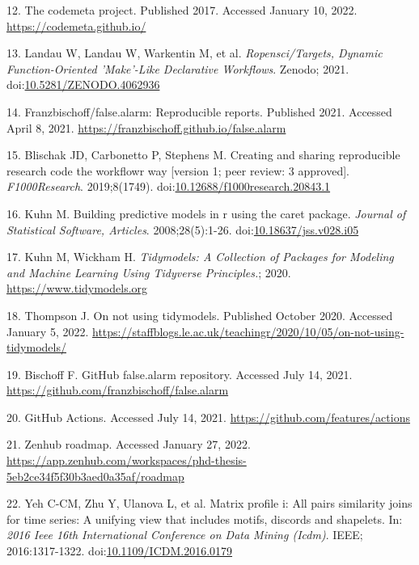 \documentclass[12pt,twoside]{fmupthesis}
\begin{document}
\leavevmode\hypertarget{ref-CodeMeta2017}{}%
12. The codemeta project. Published 2017. Accessed January 10, 2022. \url{https://codemeta.github.io/}

\leavevmode\hypertarget{ref-landau2021}{}%
13. Landau W, Landau W, Warkentin M, et al. \emph{Ropensci/Targets, Dynamic Function-Oriented 'Make'-Like Declarative Workflows}. Zenodo; 2021. doi:\href{https://doi.org/10.5281/ZENODO.4062936}{10.5281/ZENODO.4062936}

\leavevmode\hypertarget{ref-franz_website}{}%
14. Franzbischoff/false.alarm: Reproducible reports. Published 2021. Accessed April 8, 2021. \url{https://franzbischoff.github.io/false.alarm}

\leavevmode\hypertarget{ref-workflowr2021}{}%
15. Blischak JD, Carbonetto P, Stephens M. Creating and sharing reproducible research code the workflowr way {[}version 1; peer review: 3 approved{]}. \emph{F1000Research}. 2019;8(1749). doi:\href{https://doi.org/10.12688/f1000research.20843.1}{10.12688/f1000research.20843.1}

\leavevmode\hypertarget{ref-JSSv028i05}{}%
16. Kuhn M. Building predictive models in r using the caret package. \emph{Journal of Statistical Software, Articles}. 2008;28(5):1-26. doi:\href{https://doi.org/10.18637/jss.v028.i05}{10.18637/jss.v028.i05}

\leavevmode\hypertarget{ref-tidymodels2020}{}%
17. Kuhn M, Wickham H. \emph{Tidymodels: A Collection of Packages for Modeling and Machine Learning Using Tidyverse Principles.}; 2020. \url{https://www.tidymodels.org}

\leavevmode\hypertarget{ref-Thompson2020}{}%
18. Thompson J. On not using tidymodels. Published October 2020. Accessed January 5, 2022. \url{https://staffblogs.le.ac.uk/teachingr/2020/10/05/on-not-using-tidymodels/}

\leavevmode\hypertarget{ref-bischoffrepo2021}{}%
19. Bischoff F. GitHub false.alarm repository. Accessed July 14, 2021. \url{https://github.com/franzbischoff/false.alarm}

\leavevmode\hypertarget{ref-gitactions2021}{}%
20. GitHub Actions. Accessed July 14, 2021. \url{https://github.com/features/actions}

\leavevmode\hypertarget{ref-zenhub2021}{}%
21. Zenhub roadmap. Accessed January 27, 2022. \url{https://app.zenhub.com/workspaces/phd-thesis-5eb2ce34f5f30b3aed0a35af/roadmap}

\leavevmode\hypertarget{ref-Yeh2017a}{}%
22. Yeh C-CM, Zhu Y, Ulanova L, et al. Matrix profile i: All pairs similarity joins for time series: A unifying view that includes motifs, discords and shapelets. In: \emph{2016 Ieee 16th International Conference on Data Mining (Icdm)}. IEEE; 2016:1317-1322. doi:\href{https://doi.org/10.1109/ICDM.2016.0179}{10.1109/ICDM.2016.0179}
\end{document}
